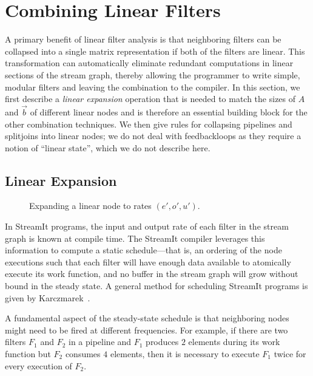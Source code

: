 \section{Combining Linear Filters}
\label{sec:combine}

A primary benefit of linear filter analysis is that neighboring
filters can be collapsed into a single matrix representation if both
of the filters are linear.  This transformation can automatically
eliminate redundant computations in linear sections of the stream
graph, thereby allowing the programmer to write simple, modular
filters and leaving the combination to the compiler.  In this section,
we first describe a {\it linear expansion} operation that is needed to
match the sizes of $A$ and $\vec{b}$ of different linear nodes and is
therefore an essential building block for the other combination
techniques.  We then give rules for collapsing pipelines and
splitjoins into linear nodes; we do not deal with feedbackloops as
they require a notion of ``linear state'', which we do not describe
here.

\subsection{Linear Expansion}

\begin{figure}[t]
\center
\vspace{-12pt}
\epsfxsize=3.2in
\vspace{-12pt}
\caption{Expanding a linear node to rates $(e', o', u')$.  }
\label{fig:expanding-a-matrix}
\makeline
\vspace{-12pt}
\end{figure}

In StreamIt programs, the input and output rate of each filter in the
stream graph is known at compile time.  The StreamIt compiler
leverages this information to compute a static schedule---that is, an
ordering of the node executions such that each filter will have enough
data available to atomically execute its work function, and no
buffer in the stream graph will grow without bound in the steady
state.  A general method for scheduling StreamIt programs is given by
Karczmarek~\cite{karczma-thesis}.

A fundamental aspect of the steady-state schedule is that neighboring
nodes might need to be fired at different frequencies.  For example,
if there are two filters $F_1$ and $F_2$ in a pipeline and
$F_1$ produces $2$ elements during its work function but $F_2$
consumes $4$ elements, then it is necessary to execute $F_1$ twice for
every execution of $F_2$.

